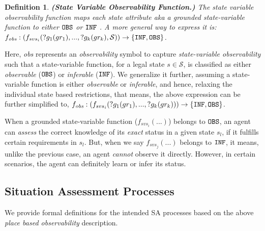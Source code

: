 \documentclass[letterpaper]{article} %
\newtheorem{definition}{Definition}
\begin{document}
\begin{definition} \label{def:svof}
\textbf{(State Variable Observability Function.)} 
The state variable observability function maps each state attribute {\em aka} a grounded \textit{state-variable function} 
to either $\texttt{OBS}$ or $\texttt{INF}$
. A more general way to express it is:
$f_{\textit{obs}}: (f_{svs_i}(?g_1(gr_1),...,?g_k(gr_k),\mathcal{S}
)) \rightarrow 
    \{\texttt{INF}, \texttt{OBS}\}$.
\end{definition}
Here, \textit{obs} represents an \textit{observability} symbol to capture \textit{state-variable observability} such that a state-variable function, for a legal state $s\in\mathcal{S}$, is classified as either \textit{observable} ($\texttt{OBS}$) or \textit{inferable} ($\texttt{INF}$). 
We generalize it further, assuming a state-variable function is either \textit{observable} or \textit{inferable}, and hence, relaxing the individual state based restrictions, that means, the above expression can be further simplified to, 
$f_{\textit{obs}}: (f_{svs_i}(?g_1(gr_1),...,?g_k(gr_k))) \rightarrow \{\texttt{INF}, \texttt{OBS}\}$.

When a grounded state-variable function ($f_{svs_i}(...)$) belongs to $\texttt{OBS}$, an agent can \textit{assess} the correct knowledge of its \textit{exact} status in a given state $s_l$, if it fulfills certain requirements in $s_l$. 
But, when we say $f_{svs_j}(...)$ belongs to $\texttt{INF}$, it means, unlike the previous case, an agent \textit{cannot} observe it directly. 
However, in certain scenarios, the agent can definitely learn or infer its status. 

\subsection{Situation Assessment Processes}
We provide formal definitions for the intended SA processes based on the above \textit{place based observability} description. 
\end{document}
